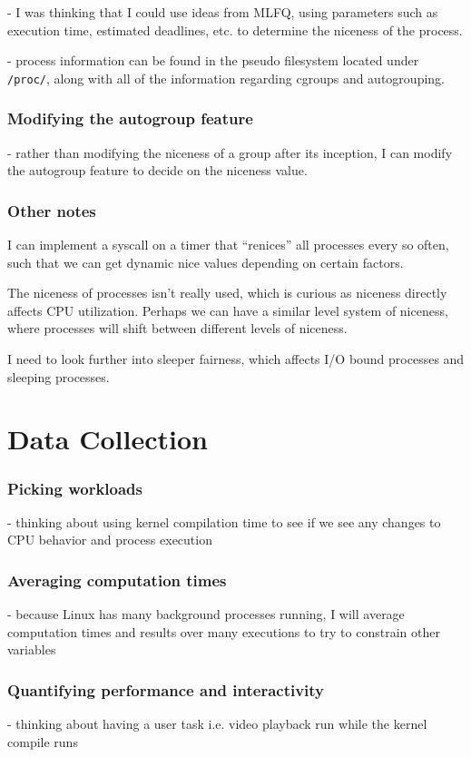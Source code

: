 \documentclass[12pt]{article}
\begin{document}
- I was thinking that I could use ideas from MLFQ, using parameters such as execution time, estimated deadlines, etc. to determine the niceness of the process.

- process information can be found in the pseudo filesystem located under \texttt{/proc/}, along with all of the information regarding cgroups and autogrouping.

\subsubsection*{Modifying the autogroup feature}

- rather than modifying the niceness of a group after its inception, I can modify the autogroup feature to decide on the niceness value.

\subsubsection*{Other notes}

I can implement a syscall on a timer that ``renices'' all processes every so often, such that we can get dynamic nice values depending on certain factors. 

The niceness of processes isn't really used, which is curious as niceness directly affects CPU utilization. Perhaps we can have a similar level system of niceness, where processes will shift between different levels of niceness. 

I need to look further into sleeper fairness, which affects I/O bound processes and sleeping processes.

\section*{Data Collection}

\subsubsection*{Picking workloads}

- thinking about using kernel compilation time to see if we see any changes to CPU behavior and process execution

\subsubsection*{Averaging computation times}

- because Linux has many background processes running, I will average computation times and results over many executions to try to constrain other variables

\subsubsection*{Quantifying performance and interactivity}

- thinking about having a user task i.e. video playback run while the kernel compile runs

 









\end{document}
